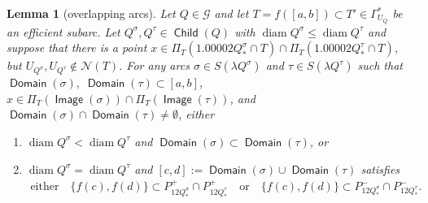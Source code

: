 \documentclass[12pt]{amsart}
\numberwithin{equation}{section}
\theoremstyle{plain}
\newtheorem{lemma}[theorem]{Lemma}
\theoremstyle{definition}
\newcommand{\diam}{\mathop\mathrm{diam}\nolimits}
\newcommand{\Domain}{\mathop\mathsf{Domain}\nolimits}
\newcommand{\Image}{\mathop\mathsf{Image}\nolimits}
\newcommand{\Child}{\mathop\mathsf{Child}\nolimits}
\numberwithin{figure}{section}
\begin{document}
\begin{lemma}[overlapping arcs]\label{unnecessary-overlaps} Let $Q\in\mathscr{G}$ and let $T=f([a,b])\subset T'\in\Gamma^*_{U_Q}$ be an efficient subarc. Let $Q^\sigma,Q^\tau\in\Child(Q)$ with $\diam Q^\sigma\leq \diam Q^\tau$ and suppose that there is a point $x\in\Pi_T(1.00002Q^\sigma_*\cap T)\cap\Pi_T(1.00002Q^\tau_*\cap T)$, but $U_{Q^\sigma},U_{Q^\tau}\not\in \mathcal{N}(T)$. For any arcs $\sigma\in S(\lambda Q^\sigma)$ and $\tau\in S(\lambda Q^\tau)$ such that $\Domain(\sigma),\;\Domain(\tau)\subset[a,b]$, $x\in \Pi_T(\Image(\sigma))\cap \Pi_T(\Image(\tau))$, and $\Domain(\sigma)\cap\Domain(\tau)\neq\emptyset$, either \begin{enumerate}
\item[(i)] $\diam Q^\sigma<\diam Q^\tau$ and $\Domain(\sigma)\subset\Domain(\tau)$, or
\item[(ii)] $\diam Q^\sigma=\diam Q^\tau$ and $[c,d]:=\Domain(\sigma)\cup\Domain(\tau)$ satisfies \begin{align*}
\text{either}\quad\{f(c), f(d)\} \subset P_{12Q^\sigma_*}^+\cap P_{12Q^\tau_*}^+\quad\text{or}\quad\{f(c), f(d)\} \subset P_{12Q^\sigma_*}^-\cap P_{12Q^\tau_*}^-.
\end{align*}
\end{enumerate}
\end{lemma}
\end{document}
